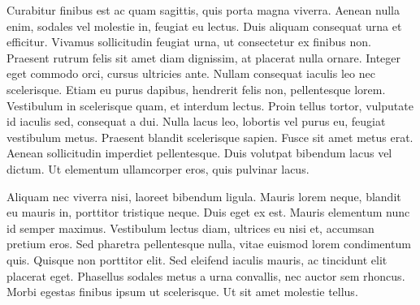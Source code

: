 Curabitur finibus est ac quam sagittis, quis porta magna viverra. Aenean nulla enim, sodales vel molestie in, feugiat eu lectus. Duis aliquam consequat urna et efficitur. Vivamus sollicitudin feugiat urna, ut consectetur ex finibus non. Praesent rutrum felis sit amet diam dignissim, at placerat nulla ornare. Integer eget commodo orci, cursus ultricies ante. Nullam consequat iaculis leo nec scelerisque. Etiam eu purus dapibus, hendrerit felis non, pellentesque lorem. Vestibulum in scelerisque quam, et interdum lectus. Proin tellus tortor, vulputate id iaculis sed, consequat a dui. Nulla lacus leo, lobortis vel purus eu, feugiat vestibulum metus. Praesent blandit scelerisque sapien. Fusce sit amet metus erat. Aenean sollicitudin imperdiet pellentesque. Duis volutpat bibendum lacus vel dictum. Ut elementum ullamcorper eros, quis pulvinar lacus.

Aliquam nec viverra nisi, laoreet bibendum ligula. Mauris lorem neque, blandit eu mauris in, porttitor tristique neque. Duis eget ex est. Mauris elementum nunc id semper maximus. Vestibulum lectus diam, ultrices eu nisi et, accumsan pretium eros. Sed pharetra pellentesque nulla, vitae euismod lorem condimentum quis. Quisque non porttitor elit. Sed eleifend iaculis mauris, ac tincidunt elit placerat eget. Phasellus sodales metus a urna convallis, nec auctor sem rhoncus. Morbi egestas finibus ipsum ut scelerisque. Ut sit amet molestie tellus.

